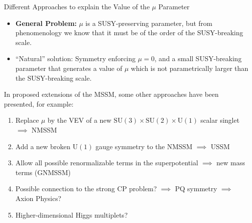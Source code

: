 \begin{frame}{Different Approaches to explain the Value of the $\mu$ Parameter}
\begin{itemize}
\item \textbf{General Problem:} $\mu$ is a \alert{SUSY-preserving parameter}, but from phenomenology we know that it must be of the order of the SUSY-breaking scale.\\[1em]

	\item \enquote{Natural} solution: Symmetry enforcing $\mu=0$, and a small SUSY-breaking parameter that generates a value of $\mu$ which is not parametrically larger than the SUSY-breaking scale.\\[1em]
\end{itemize}
In proposed extensions of the MSSM, some other approaches have been presented, for example:\\[1em]
\begin{enumerate}
	\pause
	\item Replace $\mu$ by the VEV of a new $ \mathrm{SU}(3) \times \mathrm{SU}(2) \times \mathrm{U}(1)$ scalar singlet $\implies$ NMSSM\\[1em]
	\pause
	\item Add a new broken $\mathrm{U}(1)$ gauge symmetry to the NMSSM $\implies$ USSM\\[1em]
	\pause
	\item Allow all possible renormalizable terms in the superpotential $\implies$ new mass terms (GNMSSM)\\[1em]
	\pause
	\item Possible connection to the strong CP problem? $\implies$  PQ symmetry $\implies$ Axion Physics?\\[1em]
	\pause
	\item Higher-dimensional Higgs multiplets?
\end{enumerate}
\end{frame}

